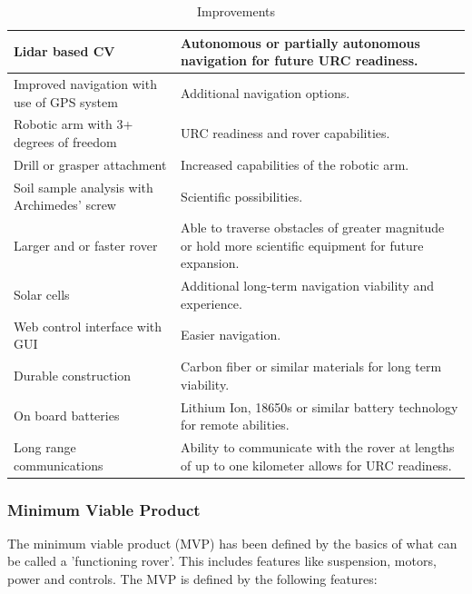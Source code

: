 \documentclass[conference]{IEEEtran} %
\begin{document}
\begin{table}[hb!]
    \caption{Improvements}
    \centering
    {\renewcommand{\arraystretch}{1.2}
    \begin{tabularx}{\linewidth}{LL}   
    \hline
    Lidar based CV & Autonomous or partially autonomous navigation for future URC readiness. \\
    \hline
    Improved navigation with use of GPS system & Additional navigation options. \\
    \hline
    Robotic arm with 3+ degrees of freedom & URC readiness and rover capabilities. \\ 
    \hline
    Drill or grasper attachment & Increased capabilities of the robotic arm. \\
    \hline
    Soil sample analysis with Archimedes' screw & Scientific possibilities. \\
    \hline
    Larger and or faster rover & Able to traverse obstacles of greater magnitude or hold more scientific equipment for future expansion. \\
    \hline
    Solar cells & Additional long-term navigation viability and experience. \\
    \hline
    Web control interface with GUI & Easier navigation. \\
    \hline
    Durable construction & Carbon fiber or similar materials for long term viability. \\
    \hline
    On board batteries & Lithium Ion, 18650s or similar battery technology for remote abilities. \\
    \hline
    Long range communications & Ability to communicate with the rover at lengths of up to one kilometer allows for URC readiness. \\
    \hline
    \end{tabularx}
    }
\label{tab:mvp-two}
\end{table}

\subsubsection{Minimum Viable Product}
The minimum viable product (MVP) has been defined by the basics of what can be called a 'functioning rover'. This includes features like suspension, motors, power and controls. The MVP is defined by the following features: 
\end{document}
